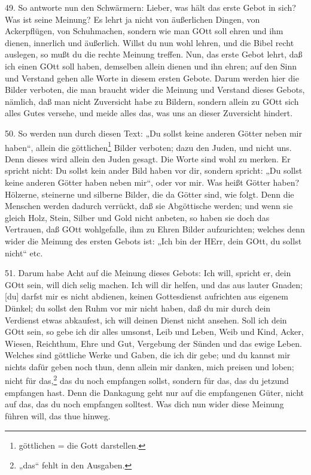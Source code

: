 49. So antworte nun den Schwärmern: Lieber, was hält das erste Gebot in sich? Was ist seine Meinung? Es lehrt ja nicht von äußerlichen Dingen, von Ackerpflügen, von Schuhmachen, sondern wie man GOtt soll ehren und ihm dienen, innerlich und äußerlich. Willst du nun wohl lehren, und die Bibel recht auslegen, so mußt du die rechte Meinung treffen. Nun, das erste Gebot lehrt, daß ich einen GOtt soll haben, demselben allein dienen und ihn ehren; auf den Sinn und Verstand gehen alle Worte in diesem ersten Gebote. Darum werden hier die Bilder verboten, die man braucht wider die Meinung und Verstand dieses Gebots, nämlich, daß man nicht Zuversicht habe zu Bildern, sondern allein zu GOtt sich alles Gutes versehe, und meide alles das, was uns an dieser Zuversicht hindert.

50. So werden nun durch diesen Text: „Du sollst keine anderen Götter neben mir haben“, allein die göttlichen\footnote{göttlichen = die Gott darstellen.} Bilder verboten; dazu den
Juden, und nicht uns. Denn dieses wird allein den Juden gesagt. Die Worte sind wohl zu merken. Er spricht nicht: Du sollst kein ander Bild haben vor dir, sondern spricht: „Du sollst keine anderen Götter haben neben mir“, oder vor mir. Was heißt Götter haben? Hölzerne, steinerne und silberne Bilder, die da Götter sind, wie folgt. Denn die Menschen werden dadurch verrückt, daß sie Abgöttische werden; und wenn sie gleich Holz, Stein, Silber und Gold nicht anbeten, so haben sie doch das Vertrauen, daß GOtt wohlgefalle, ihm zu Ehren Bilder aufzurichten; welches denn wider die Meinung des ersten Gebots ist: „Ich bin der HErr, dein GOtt, du sollst nicht“ etc.

51. Darum habe Acht auf die Meinung dieses Gebots: Ich will, spricht er, dein GOtt sein, will dich selig machen. Ich will dir helfen, und das aus lauter Gnaden; [du] darfst mir es nicht abdienen, keinen Gottesdienst aufrichten aus eigenem Dünkel; du sollst den Ruhm vor mir nicht haben, daß du mir durch dein Verdienst etwas abkaufest, ich will deinen Dienst nicht ansehen. Soll ich dein GOtt sein, so gebe ich dir alles umsonst, Leib und Leben, Weib und Kind, Acker, Wiesen, Reichthum, Ehre und Gut, Vergebung der Sünden und das ewige Leben. Welches sind göttliche Werke und Gaben, die ich dir gebe; und du kannst mir nichts dafür geben noch thun, denn allein mir danken, mich preisen und loben; nicht für das,\footnote{„das“ fehlt in den Ausgaben.} das du noch empfangen sollst, sondern für das, das du jetzund empfangen hast. Denn die Dankagung geht nur auf die empfangenen Güter, nicht auf das, das du noch empfangen solltest. Was dich nun wider diese Meinung führen will, das thue hinweg.

